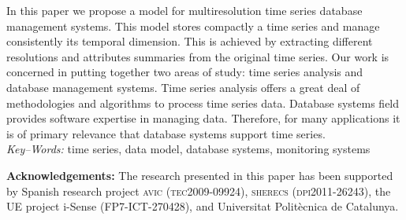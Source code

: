 \documentclass[twocolumn,11pt,a4paper]{article}
\begin{document}
{\begin{minipage}[b]{6.9in}
    In this paper we propose a model for multiresolution time series
    database management systems. This model stores compactly a time series
    and manage consistently its temporal dimension. This is achieved by
    extracting different resolutions and attributes summaries from the
    original time series.
    Our work is concerned in putting together two areas of study: time
    series analysis and database management systems. Time series analysis
    offers a great deal of methodologies and algorithms to process time
    series data. Database systems field provides software expertise in
    managing data. Therefore, for many applications it is of primary
    relevance that database systems support time series.
    \\ [4mm] {\it Key--Words:}
    time series, data model, database systems, monitoring systems
  \end{minipage}
  \vspace{-10pt}
}

\maketitle

\thispagestyle{empty} \pagestyle{empty}
%
%









\vspace{5pt plus 5pt} 
\noindent \textbf{Acknowledgements:} The research
presented in this paper has been supported by Spanish research project
\textsc{avic (tec2009-09924)}, \textsc{sherecs (dpi2011-26243)}, the
UE project i-Sense ({\small FP7-ICT-270428}), and Universitat
Polit\`{e}cnica de Catalunya.

\printbibliography{}
\end{document}
